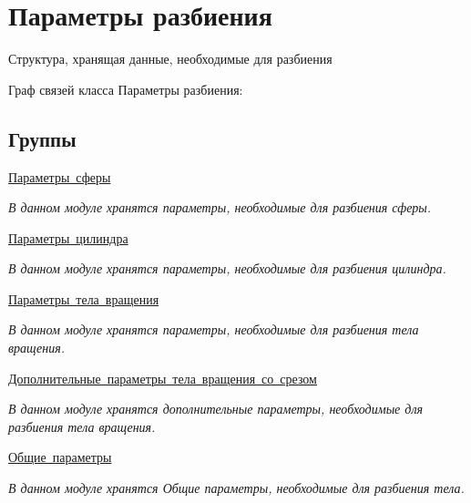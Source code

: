 \hypertarget{group__fragmentation_parameters}{}\section{Параметры разбиения}
\label{group__fragmentation_parameters}


Структура, хранящая данные, необходимые для разбиения  


Граф связей класса Параметры разбиения\+:
\subsection*{Группы}
\begin{DoxyCompactItemize}
\item 
\mbox{\hyperlink{group__sphere_parameters}{Параметры сферы}}
\begin{DoxyCompactList}\small\item\em В данном модуле хранятся параметры, необходимые для разбиения сферы. \end{DoxyCompactList}\item 
\mbox{\hyperlink{group__cylinder_parameters}{Параметры цилиндра}}
\begin{DoxyCompactList}\small\item\em В данном модуле хранятся параметры, необходимые для разбиения цилиндра. \end{DoxyCompactList}\item 
\mbox{\hyperlink{group__rotation_body_parameters}{Параметры тела вращения}}
\begin{DoxyCompactList}\small\item\em В данном модуле хранятся параметры, необходимые для разбиения тела вращения. \end{DoxyCompactList}\item 
\mbox{\hyperlink{group__rotation_bottom_cut_parameters}{Дополнительные параметры тела вращения со срезом}}
\begin{DoxyCompactList}\small\item\em В данном модуле хранятся дополнительные параметры, необходимые для разбиения тела вращения. \end{DoxyCompactList}\item 
\mbox{\hyperlink{group__common_parameters}{Общие параметры}}
\begin{DoxyCompactList}\small\item\em В данном модуле хранятся Общие параметры, необходимые для разбиения тела. \end{DoxyCompactList}\end{DoxyCompactItemize}
